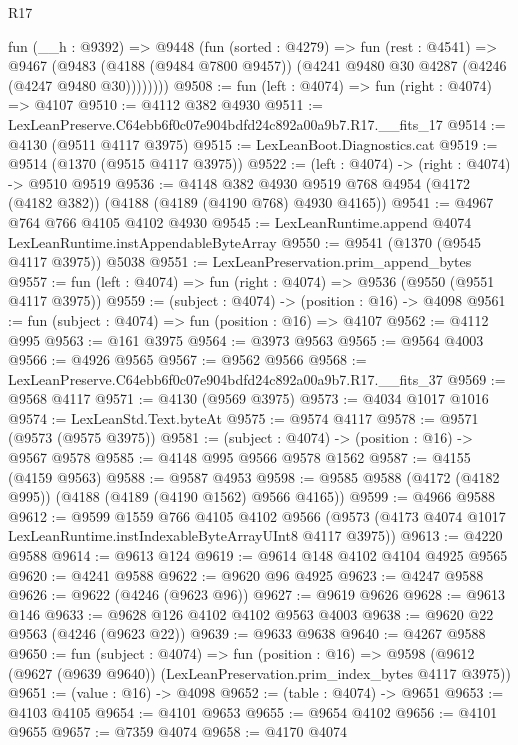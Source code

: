 \begin{lexlean}{R17}
\begin{coremodule}
        fun (__h : @9392) =>
        @9448
          (fun (sorted : @4279) =>
          fun (rest : @4541) =>
          @9467
            (@9483
              (@4188 (@9484 @7800 @9457))
              (@4241 @9480 @30 @4287 (@4246 (@4247 @9480 @30))))))))
@9508 := fun (left : @4074) => fun (right : @4074) => @4107
@9510 := @4112 @382 @4930
@9511 := LexLeanPreserve.C64ebb6f0c07e904bdfd24c892a00a9b7.R17.__fits_17
@9514 := @4130 (@9511 @4117 @3975)
@9515 := LexLeanBoot.Diagnostics.cat
@9519 := @9514 (@1370 (@9515 @4117 @3975))
@9522 := (left : @4074) -> (right : @4074) -> @9510 @9519
@9536 := @4148
    @382
    @4930
    @9519
    @768
    @4954
    (@4172 (@4182 @382))
    (@4188 (@4189 (@4190 @768) @4930 @4165))
@9541 := @4967 @764 @766 @4105 @4102 @4930
@9545 := LexLeanRuntime.append @4074 LexLeanRuntime.instAppendableByteArray
@9550 := @9541 (@1370 (@9545 @4117 @3975)) @5038
@9551 := LexLeanPreservation.prim_append_bytes
@9557 := fun (left : @4074) => fun (right : @4074) => @9536 (@9550 (@9551 @4117 @3975))
@9559 := (subject : @4074) -> (position : @16) -> @4098
@9561 := fun (subject : @4074) => fun (position : @16) => @4107
@9562 := @4112 @995
@9563 := @161 @3975
@9564 := @3973 @9563
@9565 := @9564 @4003
@9566 := @4926 @9565
@9567 := @9562 @9566
@9568 := LexLeanPreserve.C64ebb6f0c07e904bdfd24c892a00a9b7.R17.__fits_37
@9569 := @9568 @4117
@9571 := @4130 (@9569 @3975)
@9573 := @4034 @1017 @1016
@9574 := LexLeanStd.Text.byteAt
@9575 := @9574 @4117
@9578 := @9571 (@9573 (@9575 @3975))
@9581 := (subject : @4074) -> (position : @16) -> @9567 @9578
@9585 := @4148 @995 @9566 @9578 @1562
@9587 := @4155 (@4159 @9563)
@9588 := @9587 @4953
@9598 := @9585 @9588 (@4172 (@4182 @995)) (@4188 (@4189 (@4190 @1562) @9566 @4165))
@9599 := @4966 @9588
@9612 := @9599
    @1559
    @766
    @4105
    @4102
    @9566
    (@9573 (@4173 @4074 @1017 LexLeanRuntime.instIndexableByteArrayUInt8 @4117 @3975))
@9613 := @4220 @9588
@9614 := @9613 @124
@9619 := @9614 @148 @4102 @4104 @4925 @9565
@9620 := @4241 @9588
@9622 := @9620 @96 @4925
@9623 := @4247 @9588
@9626 := @9622 (@4246 (@9623 @96))
@9627 := @9619 @9626
@9628 := @9613 @146
@9633 := @9628 @126 @4102 @4102 @9563 @4003
@9638 := @9620 @22 @9563 (@4246 (@9623 @22))
@9639 := @9633 @9638
@9640 := @4267 @9588
@9650 := fun (subject : @4074) =>
  fun (position : @16) =>
  @9598 (@9612 (@9627 (@9639 @9640)) (LexLeanPreservation.prim_index_bytes @4117 @3975))
@9651 := (value : @16) -> @4098
@9652 := (table : @4074) -> @9651
@9653 := @4103 @4105
@9654 := @4101 @9653
@9655 := @9654 @4102
@9656 := @4101 @9655
@9657 := @7359 @4074
@9658 := @4170 @4074

\end{coremodule}
\end{lexlean}
